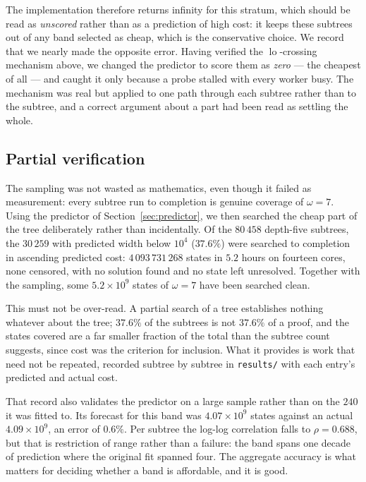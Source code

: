 \documentclass[11pt]{amsart}
\theoremstyle{remark}
\DeclareMathOperator{\lo}{lo}
\begin{document}
The implementation therefore returns infinity for this stratum, which should be
read as \emph{unscored} rather than as a prediction of high cost: it keeps these
subtrees out of any band selected as cheap, which is the conservative choice. We
record that we nearly made the opposite error. Having verified the
$\lo$-crossing mechanism above, we changed the predictor to score them as
\emph{zero} --- the cheapest of all --- and caught it only because a probe
stalled with every worker busy. The mechanism was real but applied to one path
through each subtree rather than to the subtree, and a correct argument about a
part had been read as settling the whole.

\subsection{Partial verification}\label{sec:partial}
The sampling was not wasted as mathematics, even though it failed as
measurement: every subtree run to completion is genuine coverage of $\omega = 7$.
Using the predictor of Section~\ref{sec:predictor}, we then searched the cheap
part of the tree deliberately rather than incidentally. Of the $80\,458$
depth-five subtrees, the $30\,259$ with predicted width below $10^{4}$
($37.6\%$) were searched to completion in ascending predicted cost:
$4\,093\,731\,268$ states in $5.2$ hours on fourteen cores, none censored, with
no solution found and no state left unresolved. Together with the sampling, some
$5.2 \times 10^{9}$ states of $\omega = 7$ have been searched clean.

This must not be over-read. A partial search of a tree establishes nothing
whatever about the tree; $37.6\%$ of the subtrees is not $37.6\%$ of a proof, and
the states covered are a far smaller fraction of the total than the subtree count
suggests, since cost was the criterion for inclusion. What it provides is work
that need not be repeated, recorded subtree by subtree in \texttt{results/} with
each entry's predicted and actual cost.

That record also validates the predictor on a large sample rather than on the
$240$ it was fitted to. Its forecast for this band was $4.07 \times 10^{9}$
states against an actual $4.09 \times 10^{9}$, an error of $0.6\%$. Per subtree
the log-log correlation falls to $\rho = 0.688$, but that is restriction of
range rather than a failure: the band spans one decade of prediction where the
original fit spanned four. The aggregate accuracy is what matters for deciding
whether a band is affordable, and it is good.
\end{document}
